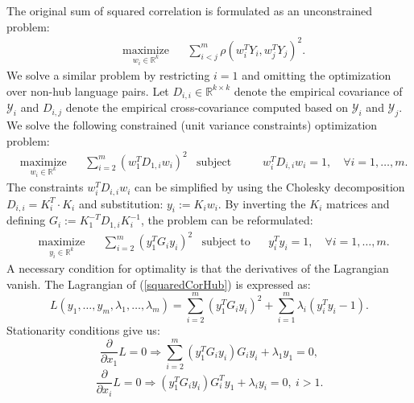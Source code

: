 \documentclass[twoside,11pt]{article}
\newcommand{\RR}{\mathbb{R}}
\begin{document}
The original sum of squared correlation is formulated as an unconstrained problem:
\begin{equation*}
  \begin{aligned}
    & \underset{w_i \in \RR^{k}}{\text{maximize}}
    & & \sum_{i < j}^m  \rho(w_i^T Y_i, w_j^T Y_j)^2.
\end{aligned}
\end{equation*}
We solve a similar problem by restricting $i=1$ and omitting the optimization over non-hub language pairs.
Let $D_{i,i} \in \RR^{k \times k}$ denote the empirical covariance of $\mathcal{Y}_i$ and $D_{i,j}$ denote the empirical cross-covariance computed based on $\mathcal{Y}_i$ and $\mathcal{Y}_j$. We solve the following constrained (unit variance constraints) optimization problem:
\begin{equation}\label{squaredCorHubOriginal}
  \begin{aligned}
    & \underset{w_i \in \RR^{k}}{\text{maximize}}
    & & \sum_{i = 2}^m  \left(w_1^T D_{1,i} w_i \right)^2
    & \text{subject to}
    & & w_i^T D_{i,i} w_i = 1, \quad\forall i = 1,\ldots, m.
\end{aligned}
\end{equation}
The constraints $w_i^T D_{i,i} w_i$ can be simplified by using the Cholesky decomposition $D_{i,i} = K_i^T \cdot K_i$ and substitution: $y_i := K_i w_i$. By inverting the $K_i$ matrices and defining  $G_i := K_1^{-T} D_{1,i} K_i^{-1}$, the problem can be reformulated:
\begin{equation}\label{squaredCorHub}
  \begin{aligned}
    & \underset{y_i \in \RR^{k}}{\text{maximize}}
    & & \sum_{i = 2}^m  \left(y_1^T G_{i} y_i \right)^2
    & \text{subject to}
    & & y_i^T y_i = 1, \quad\forall i = 1,\ldots, m.
\end{aligned}
\end{equation}
A necessary condition for optimality is that the derivatives of the Lagrangian vanish. The Lagrangian of (\ref{squaredCorHub}) is expressed as:
$$  L(y_1, \ldots, y_m, \lambda_1, \ldots, \lambda_m) = \sum_{i = 2}^m  \left(y_1^T G_{i} y_i \right)^2 + \sum_{i=1}^m \lambda_i \left(y_i^T y_i - 1\right).$$
Stationarity conditions give us:
\begin{equation}\label{dLdx1}
 \frac{\partial}{\partial x_1} L = 0 \Rightarrow \sum_{i = 2}^m  \left(y_1^T G_{i} y_i \right) G_i y_i + \lambda_1 y_1 = 0,
\end{equation}
\begin{equation}\label{dLdxi}
\frac{\partial}{\partial x_i} L = 0 \Rightarrow \left(y_1^T G_{i} y_i \right) G_{i}^T y_1 + \lambda_i y_i = 0,~i > 1.
\end{equation}
\end{document}
